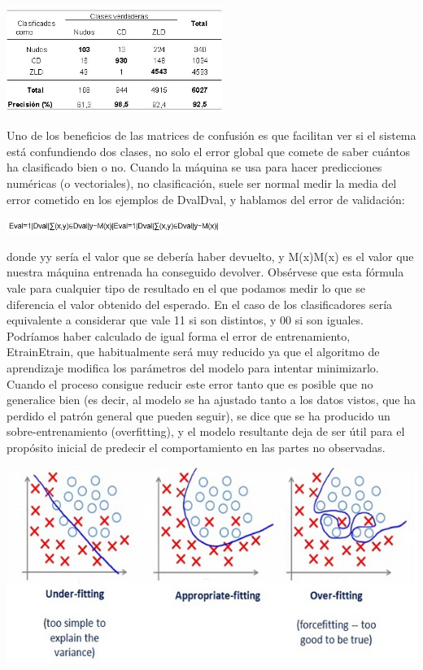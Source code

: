 \documentclass[12pt,a4paper]{report}
\begin{document}
\includegraphics[width=7cm]{./images/6}\par\vspace{1cm}

Uno de los beneficios de las matrices de confusión es que facilitan ver si el sistema está confundiendo dos clases, no solo el error global que comete de saber cuántos ha clasificado bien o no. 
Cuando la máquina se usa para hacer predicciones numéricas (o vectoriales), no clasificación, suele ser normal medir la media del error cometido en los ejemplos de DvalDval, y hablamos del error de validación:

\includegraphics[width=7cm]{./images/7}\par\vspace{1cm}

donde yy sería el valor que se debería haber devuelto, y M(x)M(x) es el valor que nuestra máquina entrenada ha conseguido devolver. Obsérvese que esta fórmula vale para cualquier tipo de resultado en el que podamos medir lo que se diferencia el valor obtenido del esperado. En el caso de los clasificadores sería equivalente a considerar que vale 11 si son distintos, y 00 si son iguales.
Podríamos haber calculado de igual forma el error de entrenamiento, EtrainEtrain, que habitualmente será muy reducido ya que el algoritmo de aprendizaje modifica los parámetros del modelo para intentar minimizarlo. Cuando el proceso consigue reducir este error tanto que es posible que no generalice bien (es decir, al modelo se ha ajustado tanto a los datos vistos, que ha perdido el patrón general que pueden seguir), se dice que se ha producido un sobre-entrenamiento (overfitting), y el modelo resultante deja de ser útil para el propósito inicial de predecir el comportamiento en las partes no observadas.

\includegraphics[width=14cm]{./images/8}\par\vspace{1cm}
\end{document}
